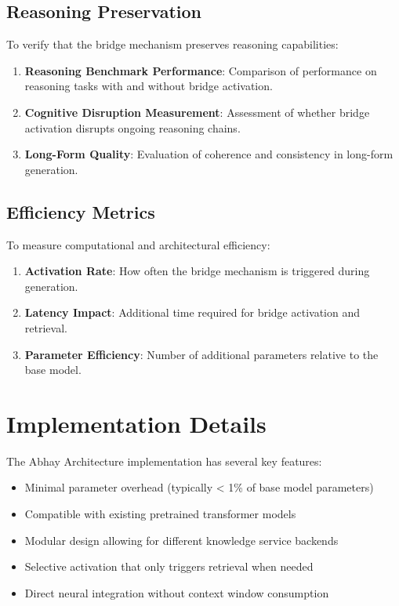 \documentclass[9pt,a4paper,twocolumn,twoside]{tau-class/tau}
\begin{document}
\subsection{Reasoning Preservation}

    To verify that the bridge mechanism preserves reasoning capabilities:

    \begin{enumerate}
        \item \textbf{Reasoning Benchmark Performance}: Comparison of performance on reasoning tasks with and without bridge activation.
        \item \textbf{Cognitive Disruption Measurement}: Assessment of whether bridge activation disrupts ongoing reasoning chains.
        \item \textbf{Long-Form Quality}: Evaluation of coherence and consistency in long-form generation.
    \end{enumerate}

\subsection{Efficiency Metrics}

    To measure computational and architectural efficiency:

    \begin{enumerate}
        \item \textbf{Activation Rate}: How often the bridge mechanism is triggered during generation.
        \item \textbf{Latency Impact}: Additional time required for bridge activation and retrieval.
        \item \textbf{Parameter Efficiency}: Number of additional parameters relative to the base model.
    \end{enumerate}

\section{Implementation Details}

    \begin{tauenv}[frametitle=Key Features of the Abhay Architecture]
        The Abhay Architecture implementation has several key features:
        \begin{itemize}
            \item Minimal parameter overhead (typically < 1\% of base model parameters)
            \item Compatible with existing pretrained transformer models
            \item Modular design allowing for different knowledge service backends
            \item Selective activation that only triggers retrieval when needed
            \item Direct neural integration without context window consumption
        \end{itemize}
    \end{tauenv}
\end{document}
